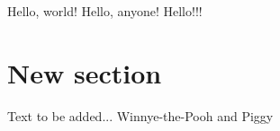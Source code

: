 
    
Hello, world!
Hello, anyone!
Hello!!!

\section{New section}
Text to be added...
Winnye-the-Pooh and Piggy

